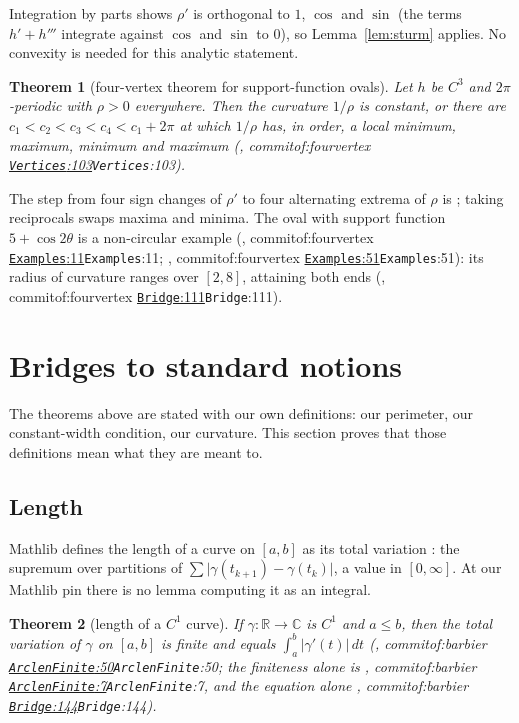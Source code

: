 \documentclass[11pt]{article}
\newtheorem{theorem}{Theorem}
\theoremstyle{definition}
\theoremstyle{remark}
\newcommand{\RR}{\mathbb{R}}
\newcommand{\CC}{\mathbb{C}}
\newcommand{\commitof}[1]{\csname commitof:#1\endcsname}
\newcommand{\repo}[1]{https://github.com/jpbald93/#1}
\newcommand{\src}[4]{\ifcsname commitof:#1\endcsname
  \href{\repo{#1}/blob/\commitof{#1}/#2/#3.lean\#L#4}{\texttt{#3}:#4}\else\texttt{#3}:#4\fi}
\begin{document}
Integration by parts shows $\rho'$ is orthogonal to $1$, $\cos$ and $\sin$ (the terms
$h'+h'''$ integrate against $\cos$ and $\sin$ to $0$), so Lemma~\ref{lem:sturm} applies. No convexity
is needed for this analytic statement.

\begin{theorem}[four-vertex theorem for support-function ovals]\label{thm:fourvertex}
Let $h$ be $C^3$ and $2\pi$-periodic with $\rho>0$ everywhere. Then the curvature $1/\rho$ is
constant, or there are $c_1<c_2<c_3<c_4<c_1+2\pi$ at which $1/\rho$ has, in order, a local minimum,
maximum, minimum and maximum (, \src{fourvertex}{FourVertex}{Vertices}{103}).
\end{theorem}

The step from four sign changes of $\rho'$ to four alternating extrema of $\rho$ is
; taking reciprocals swaps maxima and minima. The
oval with support function $5+\cos 2\theta$ is a non-circular example (, \src{fourvertex}{FourVertex}{Examples}{11}; , \src{fourvertex}{FourVertex}{Examples}{51}): its radius of curvature ranges over $[2,8]$, attaining
both ends (, \src{fourvertex}{FourVertex}{Bridge}{111}).

\section{Bridges to standard notions}\label{sec:bridges}

The theorems above are stated with our own definitions: our perimeter, our constant-width condition,
our curvature. This section proves that those definitions mean what they are meant to.

\subsection{Length}

Mathlib defines the length of a curve on $[a,b]$ as its total variation : the
supremum over partitions of $\sum\lvert\gamma(t_{k+1})-\gamma(t_k)\rvert$, a value in $[0,\infty]$.
At our Mathlib pin there is no lemma computing it as an integral.

\begin{theorem}[length of a $C^1$ curve]\label{thm:length}
If $\gamma:\RR\to\CC$ is $C^1$ and $a\le b$, then the total variation of $\gamma$ on $[a,b]$ is
finite and equals $\int_a^b\lvert\gamma'(t)\rvert\,dt$
(, \src{barbier}{Barbier}{ArclenFinite}{50}; the
finiteness alone is , \src{barbier}{Barbier}{ArclenFinite}{7}, and the equation alone
, \src{barbier}{Barbier}{Bridge}{144}).
\end{theorem}
\end{document}
